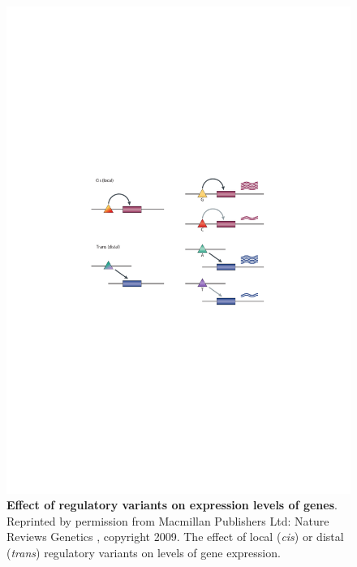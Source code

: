 \begin{figure}[H]
\includegraphics[width=\textwidth]{./Introduction/eQTL.pdf}%
\caption[Effect of regulatory variants on expression levels of genes]{\textbf{Effect of regulatory variants on expression levels of genes}. Reprinted by permission from Macmillan Publishers Ltd: Nature Reviews Genetics \parencite{Cheung2009}, copyright 2009. The effect of local (\textit{cis}) or distal (\textit{trans}) regulatory variants on levels of gene expression.}%
\label{fig:intro.eQTL}%
\end{figure}


